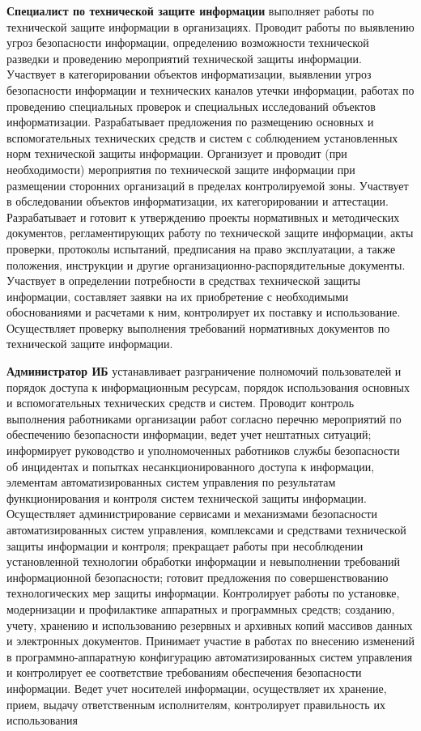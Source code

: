 \textbf{Специалист по технической защите информации} выполняет работы по технической защите информации в организациях. Проводит работы по выявлению угроз безопасности информации, определению возможности технической разведки и проведению мероприятий технической защиты информации. Участвует в категорировании объектов информатизации, выявлении угроз безопасности информации и технических каналов утечки информации, работах по проведению специальных проверок и специальных исследований объектов информатизации. Разрабатывает предложения по размещению основных и вспомогательных технических средств и систем с соблюдением установленных норм технической защиты информации. Организует и проводит (при необходимости) мероприятия по технической защите информации при размещении сторонних организаций в пределах контролируемой зоны. Участвует в обследовании объектов информатизации, их категорировании и аттестации. Разрабатывает и готовит к утверждению проекты нормативных и методических документов, регламентирующих работу по технической защите информации, акты проверки, протоколы испытаний, предписания на право эксплуатации, а также положения, инструкции и другие организационно-распорядительные документы. Участвует в определении потребности в средствах технической защиты информации, составляет заявки на их приобретение с необходимыми обоснованиями и расчетами к ним, контролирует их поставку и использование. Осуществляет проверку выполнения требований нормативных документов по технической защите информации.

\textbf{Администратор ИБ} устанавливает разграничение полномочий пользователей и порядок доступа к информационным ресурсам, порядок использования основных и вспомогательных технических средств и систем. Проводит контроль выполнения работниками организации работ согласно перечню мероприятий по обеспечению безопасности информации, ведет учет нештатных ситуаций; информирует руководство и уполномоченных работников службы безопасности об инцидентах и попытках несанкционированного доступа к информации, элементам автоматизированных систем управления по результатам функционирования и контроля систем технической защиты информации. Осуществляет администрирование сервисами и механизмами безопасности автоматизированных систем управления, комплексами и средствами технической защиты информации и контроля; прекращает работы при несоблюдении установленной технологии обработки информации и невыполнении требований информационной безопасности; готовит предложения по совершенствованию технологических мер защиты информации. Контролирует работы по установке, модернизации и профилактике аппаратных и программных средств; созданию, учету, хранению и использованию резервных и архивных копий массивов данных и электронных документов. Принимает участие в работах по внесению изменений в программно-аппаратную конфигурацию автоматизированных систем управления и контролирует ее соответствие требованиям обеспечения безопасности информации. Ведет учет носителей информации, осуществляет их хранение, прием, выдачу ответственным исполнителям, контролирует правильность их использования

